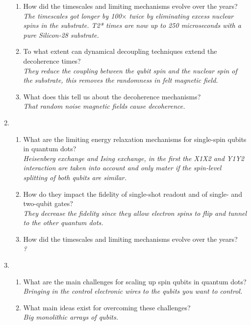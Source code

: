 \documentclass[a4paper]{scrartcl}
\newcommand{\qa}[2]{#1\\ \textit{#2}}
\begin{document}
\begin{enumerate}[label=(\alph*)]
\begin{enumerate}[label=(\roman*)]
    \item \qa{How did the timescales and limiting mechanisms evolve over the years?}{The timescales got longer by 100}$\times$ \textit{twice by eliminating excess nuclear spins in the substrate. T2* times are now up to 250 microseconds with a pure Silicon-28 substrate.}
    \item \qa{To what extent can dynamical decoupling techniques extend the decoherence times?}{They reduce the coupling between the qubit spin and the nuclear spin of the substrate, this removes the randomness in felt magnetic field.}
    \item \qa{What does this tell us about the decoherence mechanisms?}{That random noise magnetic fields cause decoherence.}
  \end{enumerate}
  \item \begin{enumerate}[label=(\roman*)]
    \item \qa{What are the limiting energy relaxation mechanisms for single-spin qubits in quantum dots?}{Heisenberg exchange and Ising exchange, in the first the X1X2 and Y1Y2 interaction are taken into account and only mater if the spin-level splitting of both qubits are similar.}
    \item \qa{How do they impact the fidelity of single-shot readout and of single- and two-qubit gates?}{They decrease the fidelity since they allow electron spins to flip and tunnel to the other quantum dots.}
    \item \qa{How did the timescales and limiting mechanisms evolve over the years?}{?}
  \end{enumerate}
  \item \begin{enumerate}[label=(\roman*)]
    \item \qa{What are the main challenges for scaling up spin qubits in quantum dots?}{Bringing in the control electronic wires to the qubits you want to control.}
    \item \qa{What main ideas exist for overcoming these challenges?}{Big monolithic arrays of qubits.}
  \end{enumerate}
\end{enumerate}
\end{document}
